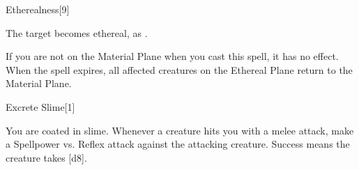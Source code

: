 \begin{spellsection}{Etherealness}[9]
    \begin{spellheader}
    \end{spellheader}
    \begin{spellcontent}
        \begin{spelltargetinginfo}
        \end{spelltargetinginfo}
        \begin{spelleffects}
            \spelleffect The target becomes ethereal, as .
        \end{spelleffects}
    \end{spellcontent}
    \begin{spellfooter}
        \spellnotes If you are not on the Material Plane when you cast this spell, it has no effect. When the spell expires, all affected creatures on the Ethereal Plane return to the Material Plane.
        \miscastexplode
    \end{spellfooter}
\end{spellsection}

\begin{spellsection}{Excrete Slime}[1]
    \begin{spellheader}
    \end{spellheader}
    \begin{spellcontent}
        \begin{spelltargetinginfo}
        \end{spelltargetinginfo}
        \begin{spelleffects}
            \spelleffect You are coated in slime. Whenever a creature hits you with a melee attack, make a Spellpower vs. Reflex attack against the attacking creature. Success means the creature takes [d8].
            \spelldur \durshort
        \end{spelleffects}
    \end{spellcontent}
    \begin{spellfooter}
        \miscastexplode
    \end{spellfooter}
\end{spellsection}

